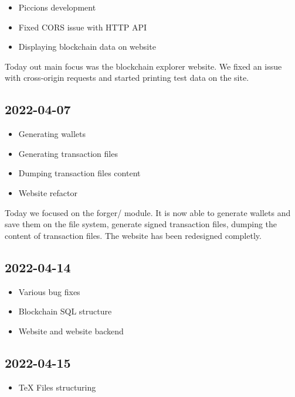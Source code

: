 \documentclass{article}
\begin{document}
\begin{itemize}
    \item Piccions development
    \item Fixed CORS issue with HTTP API
    \item Displaying blockchain data on website
\end{itemize}

Today out main focus was the blockchain explorer website.
We fixed an issue with cross-origin requests and started printing test data
on the site.

\subsection*{2022-04-07}

\begin{itemize}
    \item Generating wallets
    \item Generating transaction files
    \item Dumping transaction files content
    \item Website refactor
\end{itemize}

Today we focused on the forger/ module. It is now able
to generate wallets and save them on the file system, generate 
signed transaction files, dumping the content of transaction files.
The website has been redesigned completly.

\subsection*{2022-04-14}

\begin{itemize}
    \item Various bug fixes
    \item Blockchain SQL structure
    \item Website and website backend
\end{itemize}

\subsection*{2022-04-15}

\begin{itemize}
    \item TeX Files structuring
\end{itemize}
\end{document}
